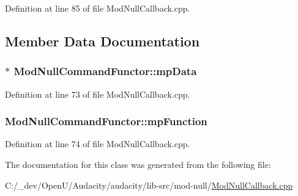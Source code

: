 Definition at line 85 of file Mod\+Null\+Callback.\+cpp.



\subsection{Member Data Documentation}
\subsubsection[{\texorpdfstring{mp\+Data}{mpData}}]{$\ast$ Mod\+Null\+Command\+Functor\+::mp\+Data}\hypertarget{class_mod_null_command_functor_a44efa1da46fe615acdd9548e17cad2c1}{}\label{class_mod_null_command_functor_a44efa1da46fe615acdd9548e17cad2c1}


Definition at line 73 of file Mod\+Null\+Callback.\+cpp.

\subsubsection[{\texorpdfstring{mp\+Function}{mpFunction}}]{ Mod\+Null\+Command\+Functor\+::mp\+Function}\hypertarget{class_mod_null_command_functor_a93207c32fc725afcdb42f86d076dc490}{}\label{class_mod_null_command_functor_a93207c32fc725afcdb42f86d076dc490}


Definition at line 74 of file Mod\+Null\+Callback.\+cpp.



The documentation for this class was generated from the following file\+:\begin{DoxyCompactItemize}
\item 
C\+:/\+\_\+dev/\+Open\+U/\+Audacity/audacity/lib-\/src/mod-\/null/\hyperlink{_mod_null_callback_8cpp}{Mod\+Null\+Callback.\+cpp}\end{DoxyCompactItemize}
